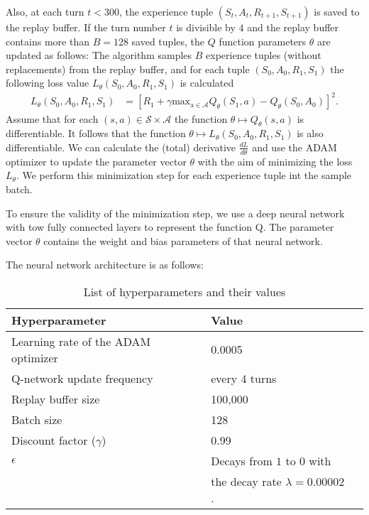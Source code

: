 \documentclass[a4paper,11pt]{amsart}
\begin{document}
Also, at each turn $t<300$, the experience tuple $\left( S_{t}, A_{t}, R_{t+1}, S_{t+1}
\right)$ is saved to the replay buffer. If the turn number $t$ is divisible by
$4$ and the replay buffer contains more than $B=128$ saved tuples, the $Q$
function parameters $\theta$ are updated as follows: The algorithm
samples $B$ experience tuples (without replacements) from the replay buffer, and
for each tuple $(S_0, A_0, R_1, S_1)$ the following loss value 
$L_\theta(S_0, A_0, R_1, S_1)$ is calculated
\begin{align*}
L_\theta(S_0, A_0, R_1, S_1) &= \left[ 
        R_1 + \gamma \operatorname{max_{a\in\mathcal A}} Q_{\theta}(S_1, a) - 
        Q_{\theta}(S_0, A_0)
    \right]^2.
\end{align*}
Assume that for each $(s, a) \in \mathcal S \times \mathcal A$ the function
$\theta \mapsto Q_{\theta}(s,a)$ is differentiable. It follows that the
function $\theta\mapsto L_\theta(S_0, A_0, R_1, S_1)$ is also differentiable.
We can calculate the (total) derivative $\frac{d L}{d\theta}$ and use the ADAM
optimizer to update the parameter vector $\theta$ with the aim of minimizing
the loss $L_{\theta}$. We perform this minimization step for each experience
tuple int the sample batch.

To ensure the validity of the minimization step, we use a deep neural network
with tow fully connected layers to represent the function Q. The parameter
vector $\theta$ contains the weight and bias parameters of that neural network.

The neural network architecture is as follows: 



\begin{table}
\caption{List of hyperparameters and their values}
\begin{tabular}{|l|l|l|}
    \hline
Hyperparameter & Value \\ 
    \hline \hline
    Learning rate of the ADAM optimizer & 0.0005 \\
    Q-network update frequency & every 4 turns \\
    Replay buffer size & 100,000 \\
    Batch size & 128  \\
    Discount factor ($\gamma$) & 0.99 \\
    $\epsilon$ & Decays from $1$ to $0$ with \\
    & the decay rate $\lambda = 0.00002$. \\
    \hline
\end{tabular}
\label{tab:hyperparameters}
\end{table}
\end{document}
